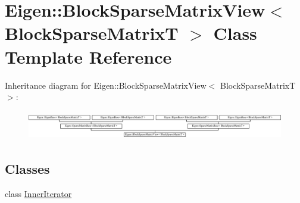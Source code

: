 \hypertarget{class_eigen_1_1_block_sparse_matrix_view}{}\section{Eigen\+:\+:Block\+Sparse\+Matrix\+View$<$ Block\+Sparse\+MatrixT $>$ Class Template Reference}
\label{class_eigen_1_1_block_sparse_matrix_view}
Inheritance diagram for Eigen\+:\+:Block\+Sparse\+Matrix\+View$<$ Block\+Sparse\+MatrixT $>$\+:\begin{figure}[H]
\begin{center}
\leavevmode
\includegraphics[height=1.276596cm]{class_eigen_1_1_block_sparse_matrix_view}
\end{center}
\end{figure}
\subsection*{Classes}
\begin{DoxyCompactItemize}
\item 
class \hyperlink{class_eigen_1_1_block_sparse_matrix_view_1_1_inner_iterator}{Inner\+Iterator}
\end{DoxyCompactItemize}
